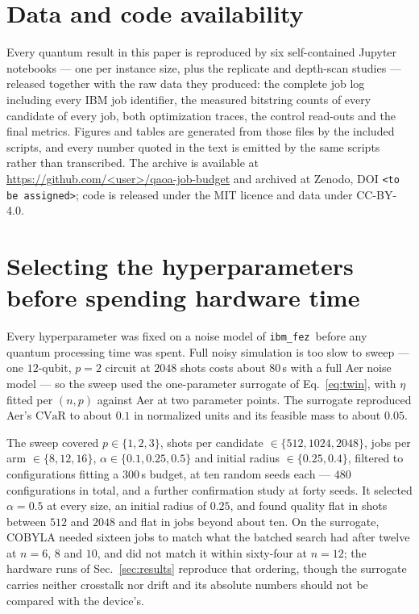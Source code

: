 \documentclass[aps,prx,preprint,superscriptaddress,nofootinbib,longbibliography]{revtex4-2}
\newcommand{\CVaR}{\mathrm{CVaR}}
\newcommand{\ibmfez}{\texttt{ibm\_fez}}
\begin{document}
\section*{Data and code availability}

Every quantum result in this paper is reproduced by six self-contained Jupyter notebooks --- one
per instance size, plus the replicate and depth-scan studies --- released together with the raw
data they produced: the complete job log
including every IBM job identifier, the measured bitstring counts of every candidate of every
job, both optimization traces, the control read-outs and the final metrics. Figures and tables
are generated from those files by the included scripts, and every number quoted in the text is
emitted by the same scripts rather than transcribed. The archive is available at
\url{https://github.com/<user>/qaoa-job-budget} and archived at Zenodo,
DOI \texttt{<to be assigned>}; code is released under the MIT licence and data under
CC-BY-4.0.

\appendix

\section{Selecting the hyperparameters before spending hardware time}
\label{app:tuning}

Every hyperparameter was fixed on a noise model of \ibmfez\ before any quantum processing time
was spent. Full noisy simulation is too slow to sweep --- one $12$-qubit, $p=2$ circuit at
$2048$ shots costs about $80\,$s with a full Aer noise model --- so the sweep used the
one-parameter surrogate of Eq.~\eqref{eq:twin}, with $\eta$ fitted per $(n,p)$ against Aer at
two parameter points. The surrogate reproduced Aer's $\CVaR$ to about $0.1$ in normalized
units and its feasible mass to about $0.05$.

The sweep covered $p \in \{1,2,3\}$, shots per candidate $\in \{512, 1024, 2048\}$, jobs per
arm $\in \{8,12,16\}$, $\alpha \in \{0.1, 0.25, 0.5\}$ and initial radius $\in \{0.25, 0.4\}$,
filtered to configurations fitting a $300\,$s budget, at ten random seeds each --- $480$
configurations in total, and a further confirmation study at forty seeds. It selected
$\alpha = 0.5$ at every size, an initial radius of $0.25$, and found quality flat in shots
between $512$ and $2048$ and flat in jobs beyond about ten. On the surrogate, COBYLA needed sixteen jobs to match what the batched
search had after twelve at $n = 6$, $8$ and $10$, and did not match it within sixty-four at
$n = 12$; the hardware runs of Sec.~\ref{sec:results} reproduce that ordering, though the
surrogate carries neither crosstalk nor drift and its absolute numbers should not be compared
with the device's.
\end{document}
